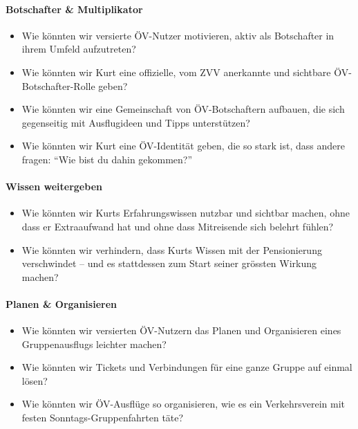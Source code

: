 \paragraph{Botschafter \& Multiplikator}
\begin{itemize}[nosep]
  \item Wie könnten wir versierte ÖV-Nutzer motivieren, aktiv als Botschafter in ihrem Umfeld aufzutreten?
  \item Wie könnten wir Kurt eine offizielle, vom ZVV anerkannte und sichtbare ÖV-Botschafter-Rolle geben?
  \item Wie könnten wir eine Gemeinschaft von ÖV-Botschaftern aufbauen, die sich gegenseitig mit Ausflugideen und Tipps unterstützen?
  \item Wie könnten wir Kurt eine ÖV-Identität geben, die so stark ist, dass andere fragen: \enquote{Wie bist du dahin gekommen?}
\end{itemize}

\paragraph{Wissen weitergeben}
\begin{itemize}[nosep]
  \item Wie könnten wir Kurts Erfahrungswissen nutzbar und sichtbar machen, ohne dass er Extraaufwand hat und ohne dass Mitreisende sich belehrt fühlen?
  \item Wie könnten wir verhindern, dass Kurts Wissen mit der Pensionierung verschwindet -- und es stattdessen zum Start seiner grössten Wirkung machen?
\end{itemize}

\paragraph{Planen \& Organisieren}
\begin{itemize}[nosep]
  \item Wie könnten wir versierten ÖV-Nutzern das Planen und Organisieren eines Gruppenausflugs leichter machen?
  \item Wie könnten wir Tickets und Verbindungen für eine ganze Gruppe auf einmal lösen?
  \item Wie könnten wir ÖV-Ausflüge so organisieren, wie es ein Verkehrsverein mit festen Sonntags-Gruppenfahrten täte?
\end{itemize}

